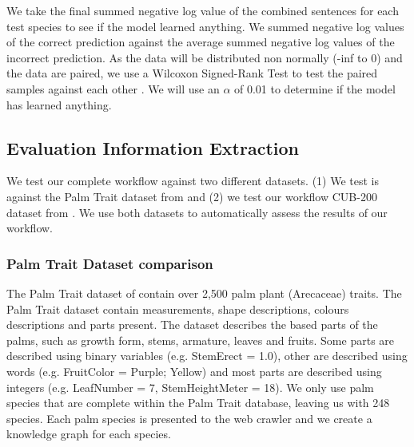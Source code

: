 \documentclass[a4paper, 12pt, oneside]{book} %
\begin{document}
We take the final summed negative log  value of the combined sentences for each test species to see if the model learned anything.
We summed negative log values of the correct prediction against the average summed negative log values of the incorrect prediction.
As the data will be distributed non normally (-inf to 0) and the data are paired, we use a Wilcoxon Signed-Rank Test to test the paired samples against each other \autocite{wilcoxon_individual_1945}.
We will use an \(\alpha\) of 0.01 to determine if the model has learned anything. 


\subsection{Evaluation Information Extraction}
We test our complete workflow against two different datasets. 
(1) We test is against the Palm Trait dataset from \textcite{kissling_palmtraits_2019} and (2) we test our workflow CUB-200 dataset from \textcite{welinder_caltech-ucsd_2010}.
We use both datasets to automatically assess the results of our workflow.


\subsubsection{Palm Trait Dataset comparison}
The Palm Trait dataset of \textcite{kissling_palmtraits_2019} contain over 2,500 palm plant (Arecaceae) traits. 
The Palm Trait dataset contain measurements, shape descriptions, colours descriptions and parts present.
The dataset describes the based parts of the palms, such as growth form, stems, armature, leaves and fruits.
Some parts are described using binary variables (e.g. StemErect = 1.0), other are described using words (e.g. FruitColor = Purple; Yellow) and most parts are described using integers (e.g. LeafNumber = 7, StemHeightMeter = 18).
We only use palm species that are complete within the Palm Trait database, leaving us with 248 species.
Each palm species is presented to the web crawler and we create a knowledge graph for each species.
\newline
\end{document}
